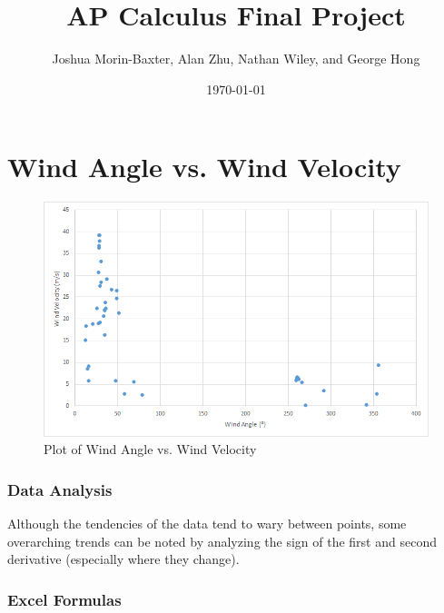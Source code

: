 \documentclass{journal}
\begin{document}
\title{AP Calculus Final Project}
\author{Joshua Morin-Baxter, Alan Zhu, Nathan Wiley, and George Hong}
\date{\today}

\maketitle

\part{Wind Angle vs. Wind Velocity}
\begin{figure}[H]
  \centering
  \includegraphics[width=6in]{alan-data.png}
  \caption{Plot of Wind Angle vs. Wind Velocity}
\end{figure}
\section{Data Analysis}
Although the tendencies of the data tend to wary between points, some overarching trends can be noted by analyzing the sign of the first and second derivative (especially where they change).
\section{Excel Formulas}
\end{document}

